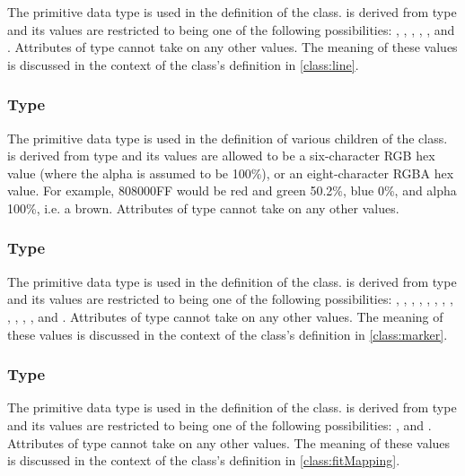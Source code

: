 \begin{blockChanged}
The  primitive data type is used in the definition of the \Line class.   is derived from type  and its values are restricted to being one of the following possibilities: , , , , , and .  Attributes of type  cannot take on any other values.  The meaning of these values is discussed in the context of the \Line class's definition in \ref{class:line}.

\subsubsection[\element{SedColor}]{Type }
\label{type:sedColor}

The  primitive data type is used in the definition of various children of the \Style class.   is derived from type  and its values are allowed to be a six-character RGB hex value (where the alpha is assumed to be 100\%), or an eight-character RGBA hex value.  For example, 808000FF would be red and green 50.2\%, blue 0\%, and alpha 100\%, i.e. a brown.  Attributes of type  cannot take on any other values.

\subsubsection[\element{MarkerType}]{Type }
\label{type:markerType}

The  primitive data type is used in the definition of the \Marker class.   is derived from type  and its values are restricted to being one of the following possibilities: , , , , , , , , , , , , and .  Attributes of type  cannot take on any other values.  The meaning of these values is discussed in the context of the \Marker class's definition in \ref{class:marker}.


\subsubsection[\element{MappingType}]{Type }
\label{type:mappingType}

The  primitive data type is used in the definition of the \FitMapping class.   is derived from type  and its values are restricted to being one of the following possibilities: ,  and .  Attributes of type  cannot take on any other values.  The meaning of these values is discussed in the context of the \FitMapping class's definition in \ref{class:fitMapping}.



\end{blockChanged}
